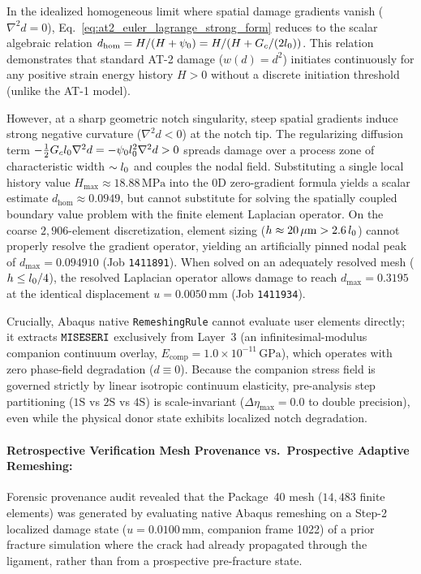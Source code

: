 In the idealized homogeneous limit where spatial damage gradients vanish ($\nabla^2 d = 0$), Eq.~\eqref{eq:at2_euler_lagrange_strong_form} reduces to the scalar algebraic relation $d_{\mathrm{hom}} = H / (H + \psi_0) = H / (H + G_c/(2l_0))$. This relation demonstrates that standard AT-2 damage ($w(d)=d^2$) initiates continuously for any positive strain energy history $H > 0$ without a discrete initiation threshold (unlike the AT-1 model). 

However, at a sharp geometric notch singularity, steep spatial gradients induce strong negative curvature ($\nabla^2 d < 0$) at the notch tip. The regularizing diffusion term $-\frac{1}{2} G_c l_0 \nabla^2 d = -\psi_0 l_0^2 \nabla^2 d > 0$ spreads damage over a process zone of characteristic width $\sim l_0$ and couples the nodal field. Substituting a single local history value $H_{\max} \approx 18.88\,\mathrm{MPa}$ into the 0D zero-gradient formula yields a scalar estimate $d_{\mathrm{hom}} \approx 0.0949$, but cannot substitute for solving the spatially coupled boundary value problem with the finite element Laplacian operator. On the coarse $2{,}906$-element discretization, element sizing ($h \approx 20\,\mu\mathrm{m} > 2.6\,l_0$) cannot properly resolve the gradient operator, yielding an artificially pinned nodal peak of $d_{\max} = 0.094910$ (Job \texttt{1411891}). When solved on an adequately resolved mesh ($h \le l_0/4$), the resolved Laplacian operator allows damage to reach $d_{\max} = 0.3195$ at the identical displacement $u = 0.0050\,\mathrm{mm}$ (Job \texttt{1411934}). 

Crucially, Abaqus native \texttt{RemeshingRule} cannot evaluate user elements directly; it extracts $\texttt{MISESERI}$ exclusively from Layer~3 (an infinitesimal-modulus companion continuum overlay, $E_{\mathrm{comp}} = 1.0\times 10^{-11}\,\mathrm{GPa}$), which operates with zero phase-field degradation ($d \equiv 0$). Because the companion stress field is governed strictly by linear isotropic continuum elasticity, pre-analysis step partitioning ($1\mathrm{S}$ vs $2\mathrm{S}$ vs $4\mathrm{S}$) is scale-invariant ($\Delta \eta_{\max} = 0.0$ to double precision), even while the physical donor state exhibits localized notch degradation.

\paragraph{Retrospective Verification Mesh Provenance vs.\ Prospective Adaptive Remeshing:}
Forensic provenance audit revealed that the Package~40 mesh ($14{,}483$ finite elements) was generated by evaluating native Abaqus remeshing on a Step-2 localized damage state ($u = 0.0100\,\mathrm{mm}$, companion frame 1022) of a prior fracture simulation where the crack had already propagated through the ligament, rather than from a prospective pre-fracture state. 

